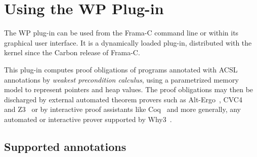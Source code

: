 \chapter{Using the WP Plug-in}
\label{wp-plugin}

The \textsf{WP} plug-in can be used from the \textsf{Frama-C} command line
or within its graphical user interface. It is a
dynamically loaded plug-in, distributed with the kernel since the
\textsf{Carbon} release of \textsf{Frama-C}.

This plug-in computes proof obligations of programs annotated with
\textsf{ACSL} annotations by \emph{weakest precondition calculus},
using a parametrized memory model to represent pointers and heap
values. The proof obligations may then be discharged by external
automated theorem provers such as
\textsf{Alt-Ergo}~\cite{AltErgo2006},
\textsf{CVC4}~\cite{CVC4} and
\textsf{Z3}~\cite{Z3}
or by interactive proof assistants
like \textsf{Coq}~\cite{Coq84} and more generally, any automated or interactive
prover supported by \textsf{Why3}~\cite{Why3}.

\clearpage
\section{Supported annotations}

